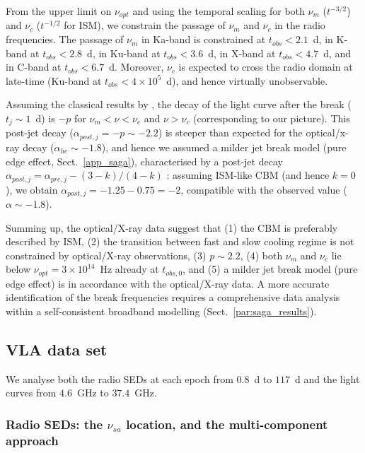 \documentclass{aa}
\begin{document}
From the upper limit on $\nu_{opt}$ and using the temporal scaling for both $\nu_m$ ($t^{-3/2}$) and $\nu_c$ ($t^{-1/2}$ for ISM), we constrain the passage of $\nu_m$ and $\nu_c$ in the radio frequencies.
The passage of $\nu_m$ in Ka-band is constrained at $t_{obs} < 2.1$~d, in K-band at $t_{obs} < 2.8$~d, in Ku-band at $t_{obs} < 3.6$~d, in X-band at $t_{obs} < 4.7$~d, and in C-band at $t_{obs} < 6.7$~d.
Moreover, $\nu_c$ is expected to cross the radio domain at late-time (Ku-band at $t_{obs} < 4 \times 10^5$~d), and hence virtually unobservable.

Assuming the classical results by \citet{Sari99b}, the decay of the light curve after the break ($t_j \sim 1$~d) is $-p$ for $\nu_m < \nu < \nu_c$  and $\nu > \nu_c$ (corresponding to our picture).
This post-jet decay ($\alpha_{post,j} = -p \sim -2.2$) is steeper than expected for the optical/x-ray decay ($\alpha_{he} \sim -1.8$), and hence we assumed a milder jet break model (pure edge effect, Sect.~\ref{app_saga}), characterised by a post-jet decay $\alpha_{post,j} = \alpha_{pre,j} - (3-k)/(4-k)$ \citep{Granot07}: assuming ISM-like CBM (and hence $k = 0$), we obtain $\alpha_{post,j} = -1.25 - 0.75 = -2$, compatible with the observed value ($\alpha \sim -1.8$).

Summing up, the optical/X-ray data suggest that (1) the CBM is preferably described by ISM, (2) the transition between fast and slow cooling regime is not constrained by optical/X-ray observations, (3) $p \sim 2.2$, (4) both $\nu_m$ and $\nu_c$ lie below $\nu_{opt} = 3 \times 10^{14}$~Hz already at $t_{obs,0}$, and (5) a milder jet break model (pure edge effect) is in accordance with the optical/X-ray data.
A more accurate identification of the break frequencies requires a comprehensive data analysis within a self-consistent broadband modelling (Sect.~\ref{par:saga_results}).


\subsection{VLA data set}
\label{par:radio}

We analyse both the radio SEDs at each epoch from $0.8$~d to $117$~d and the light curves from $4.6$~GHz to $37.4$~GHz.


\subsubsection{Radio SEDs: the $\nu_{sa}$ location, and the multi-component approach}
\label{par:radiosed}
\end{document}
